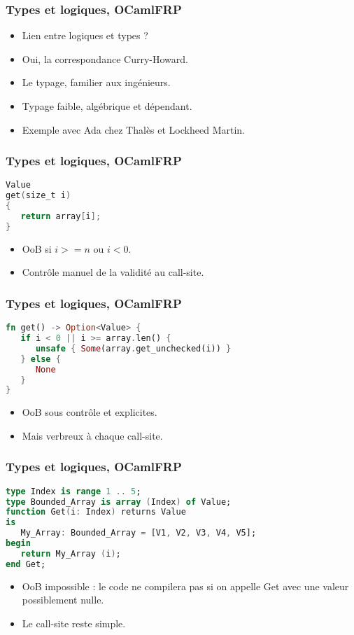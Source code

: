 \documentclass{beamer}
\begin{document}

\begin{frame}
\frametitle{Types et logiques, OCamlFRP}

\begin{itemize}
\item Lien entre logiques et types ?
\item Oui, la correspondance Curry-Howard.
\item Le typage, familier aux ingénieurs.
\item Typage faible, algébrique et dépendant.
\item Exemple avec Ada chez Thalès et Lockheed
      Martin.
\end{itemize}
\end{frame}

\begin{frame}[fragile]
\frametitle{Types et logiques, OCamlFRP}

\begin{lstlisting}[language=C]
Value
get(size_t i)
{
   return array[i];
}
\end{lstlisting}

\begin{itemize}
\item OoB si $i >= n$ ou $i < 0$.
\item Contrôle manuel de la validité au call-site.
\end{itemize}
\end{frame}

\begin{frame}[fragile]
\frametitle{Types et logiques, OCamlFRP}

\begin{lstlisting}[language=Rust]
fn get() -> Option<Value> {
   if i < 0 || i >= array.len() {
      unsafe { Some(array.get_unchecked(i)) }
   } else {
      None
   }
}
\end{lstlisting}

\begin{itemize}
\item OoB sous contrôle et explicites.
\item Mais verbreux à chaque call-site.
\end{itemize}
\end{frame}

\begin{frame}[fragile]
\frametitle{Types et logiques, OCamlFRP}

\begin{lstlisting}[language=Ada]
type Index is range 1 .. 5;
type Bounded_Array is array (Index) of Value;
function Get(i: Index) returns Value
is
   My_Array: Bounded_Array = [V1, V2, V3, V4, V5];
begin
   return My_Array (i);
end Get;
\end{lstlisting}

\begin{itemize}
\item OoB impossible : le code ne compilera pas si
      on appelle Get avec une valeur possiblement
      nulle.
\item Le call-site reste simple.
\end{itemize}
\end{frame}
\end{document}
